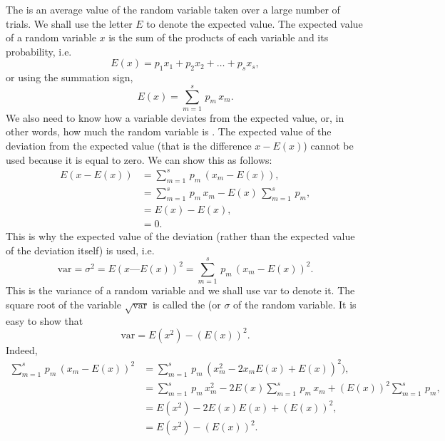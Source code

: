 The  is an average value of the random variable taken over a large number of trials. We shall use the letter $E$ to denote the expected value. The expected value of a random variable $x$ is the sum of the products of each variable and its probability, i.e.
\begin{equation*}%
E(x) =  p_{1}x_{1} +  p_{2}x_{2} +  \ldots +  p_{s}x_{s},
\end{equation*}
or using the summation sign,
\begin{equation}%
E(x) = \sum_{m=1}^{s} \, p_{m} \,x_{m}.
\label{eq-1.4}
\end{equation}
We also need to know how a variable deviates from the expected
value, or, in other words, how much the random variable is .
The expected value of the deviation from the expected value (that is the
difference $x - E(x)$) cannot be used because it is equal to zero. We can
show this as follows:
\begin{align*}%
E(x- E(x)) & =  \sum_{m=1}^{s} \, p_{m} \, ( x_{m} - E(x)), \\
& =  \sum_{m=1}^{s} \, p_{m} \,x_{m} - E(x) \,  \sum_{m=1}^{s} \,
  p_{m}, \\
& = E(x) - E(x),\\
& = 0.
\end{align*}
This is why the expected value of the  deviation (rather than the expected value of the deviation itself) is used, i.e.
\begin{equation}%
\textrm{var} = \sigma^{2} = E(x — E(x))^{2} = \sum_{m=1}^{s} \, p_{m}
\, ( x_{m} - E(x))^{2}.
\label{eq-1.5}
\end{equation}
This is the variance of a random variable and we shall use var to denote
it. The square root of the variable $\sqrt{\textrm{var}}$ is called the  (or
 $\sigma$ of the random variable. It is easy to show that
\begin{equation}
\textrm{var} = E (x^{2}) - (E(x))^{2}. 
\label{eq-1.6}
\end{equation}
Indeed,
\begin{align*}%
 \sum_{m=1}^{s} \, p_{m}  \, ( x_{m} - E(x))^{2} & =  \sum_{m=1}^{s} \, p_{m}
\, ( x_{m}^{2} - 2x_{m} E(x) + E(x))^{2}),\\
& = \sum_{m=1}^{s} \, p_{m}  \,  x_{m}^{2} - 2E(x) \sum_{m=1}^{s} \, p_{m}
\,  x_{m} + (E(x))^{2} \sum_{m=1}^{s} \, p_{m}, \\
& = E(x^{2}) - 2 E(x) E(x) + (E(x))^2,\\
& = E(x^{2}) - (E(x))^{2}.
\end{align*}


